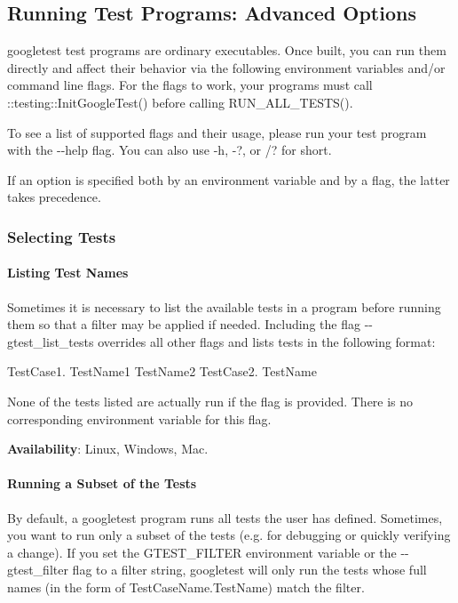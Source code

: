 \subsection*{Running Test Programs\+: Advanced Options}

googletest test programs are ordinary executables. Once built, you can run them directly and affect their behavior via the following environment variables and/or command line flags. For the flags to work, your programs must call {\ttfamily \+::testing\+::\+Init\+Google\+Test()} before calling {\ttfamily R\+U\+N\+\_\+\+A\+L\+L\+\_\+\+T\+E\+S\+T\+S()}.

To see a list of supported flags and their usage, please run your test program with the {\ttfamily -\/-\/help} flag. You can also use {\ttfamily -\/h}, {\ttfamily -\/?}, or {\ttfamily /?} for short.

If an option is specified both by an environment variable and by a flag, the latter takes precedence.

\subsubsection*{Selecting Tests}

\paragraph*{Listing Test Names}

Sometimes it is necessary to list the available tests in a program before running them so that a filter may be applied if needed. Including the flag {\ttfamily -\/-\/gtest\+\_\+list\+\_\+tests} overrides all other flags and lists tests in the following format\+:


\begin{DoxyCode}
TestCase1.
  TestName1
  TestName2
TestCase2.
  TestName
\end{DoxyCode}


None of the tests listed are actually run if the flag is provided. There is no corresponding environment variable for this flag.

{\bfseries Availability}\+: Linux, Windows, Mac.

\paragraph*{Running a Subset of the Tests}

By default, a googletest program runs all tests the user has defined. Sometimes, you want to run only a subset of the tests (e.\+g. for debugging or quickly verifying a change). If you set the {\ttfamily G\+T\+E\+S\+T\+\_\+\+F\+I\+L\+T\+ER} environment variable or the {\ttfamily -\/-\/gtest\+\_\+filter} flag to a filter string, googletest will only run the tests whose full names (in the form of {\ttfamily Test\+Case\+Name.\+Test\+Name}) match the filter.

